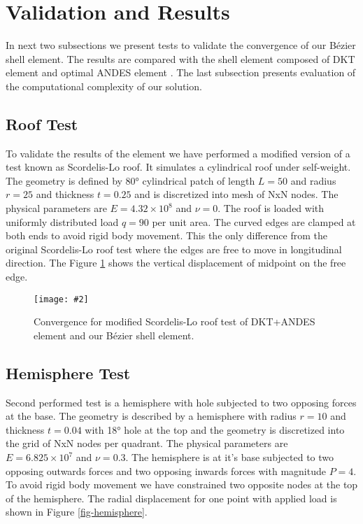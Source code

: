 \documentclass{egpubl}
\newcommand{\Figure}[3]{%
\begin{figure}[htb]
  \centering
  \texttt{[image: \#2]}
  \caption{\label{fig-#2}#3}
\end{figure}}
\begin{document}

\section{Validation and Results} %


In next two subsections we present tests to validate the convergence of our
B\'ezier shell element. The results are compared with the shell element
composed of DKT element and optimal ANDES element \cite{Felippa2003}. The
last subsection presents evaluation of the computational complexity of our
solution.

\subsection{Roof Test}

To validate the results of the element we have performed a modified version
of a test known as Scordelis-Lo roof. It simulates a cylindrical roof under
self-weight. The geometry is defined by 80° cylindrical patch of length
$L=50$ and radius $r=25$ and thickness $t=0.25$ and is discretized into
mesh of NxN nodes. The physical parameters are $E = 4.32 \times 10^8$ and
$\nu = 0$. The roof is loaded with uniformly distributed load $q = 90$ per
unit area. The curved edges are clamped at both ends to avoid rigid body
movement. This the only difference from the original Scordelis-Lo roof test
where the edges are free to move in longitudinal direction. The Figure
\ref{fig-roof} shows the vertical displacement of midpoint on the free
edge.

\Figure{\linewidth}{roof}
{Convergence for modified Scordelis-Lo roof test of DKT+ANDES element and
our B\'ezier shell element.}


\subsection{Hemisphere Test}

Second performed test is a hemisphere with hole subjected to two opposing
forces at the base. The geometry is described by a hemisphere with radius
$r=10$ and thickness $t=0.04$ with 18° hole at the top and the geometry is
discretized into the grid of NxN nodes per quadrant. The physical
parameters are $E = 6.825 \times 10^7$ and $\nu = 0.3$. The hemisphere is
at it's base subjected to two opposing outwards forces and two opposing
inwards forces with magnitude $P = 4$. To avoid rigid body movement we have
constrained two opposite nodes at the top of the hemisphere. The radial
displacement for one point with applied load is shown in Figure
\ref{fig-hemisphere}.
\end{document}
